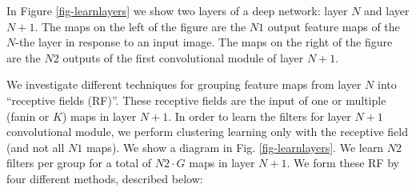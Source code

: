 \documentclass{article} %
\begin{document}
In Figure \ref{fig-learnlayers} we show two layers of a deep network: layer $N$ and layer $N+1$.
The maps on the left of the figure are the $N1$ output feature maps of the $N$-the layer in response to an input image.
The maps on the right of the figure are the $N2$ outputs of the first convolutional module of layer $N+1$. 

We investigate different techniques for grouping feature maps from layer $N$ into ``receptive fields (RF)''.
These receptive fields are the input of one or multiple (fanin or $K$) maps in layer $N+1$. In order to learn the filters for layer $N+1$ convolutional module, we perform clustering learning only with the receptive field (and not all $N1$ maps). We show a diagram in Fig. \ref{fig-learnlayers}. We learn $N2$ filters per group for a total of $N2 \cdot G$ maps in layer $N+1$.
We form these RF by four different methods, described below:
\end{document}
